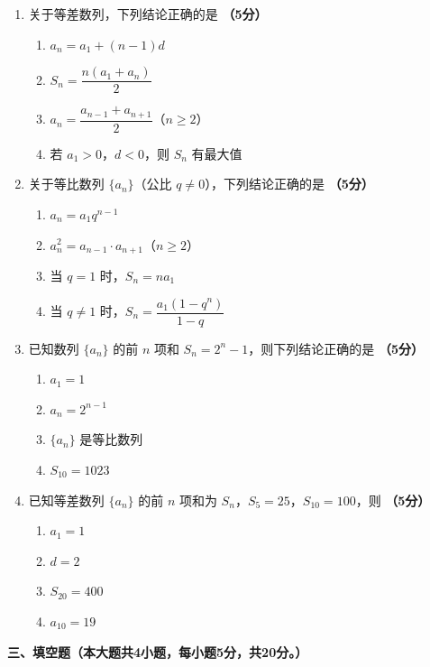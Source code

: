 \documentclass[12pt, a4paper]{ctexart}
\newcommand{\score}[1]{\hfill\textbf{（#1分）}}
\begin{document}
\begin{enumerate}[resume]
\item 关于等差数列，下列结论正确的是 \score{5}
\begin{enumerate}[label=\Alph*.]
\item $a_n=a_1+(n-1)d$
\item $S_n=\dfrac{n(a_1+a_n)}{2}$
\item $a_n=\dfrac{a_{n-1}+a_{n+1}}{2}$（$n\geq 2$）
\item 若 $a_1>0$，$d<0$，则 $S_n$ 有最大值
\end{enumerate}

\item 关于等比数列 $\{a_n\}$（公比 $q\neq 0$），下列结论正确的是 \score{5}
\begin{enumerate}[label=\Alph*.]
\item $a_n=a_1q^{n-1}$
\item $a_n^2=a_{n-1}\cdot a_{n+1}$（$n\geq 2$）
\item 当 $q=1$ 时，$S_n=na_1$
\item 当 $q\neq 1$ 时，$S_n=\dfrac{a_1(1-q^n)}{1-q}$
\end{enumerate}

\item 已知数列 $\{a_n\}$ 的前 $n$ 项和 $S_n=2^n-1$，则下列结论正确的是 \score{5}
\begin{enumerate}[label=\Alph*.]
\item $a_1=1$
\item $a_n=2^{n-1}$
\item $\{a_n\}$ 是等比数列
\item $S_{10}=1023$
\end{enumerate}

\item 已知等差数列 $\{a_n\}$ 的前 $n$ 项和为 $S_n$，$S_5=25$，$S_{10}=100$，则 \score{5}
\begin{enumerate}[label=\Alph*.]
\item $a_1=1$
\item $d=2$
\item $S_{20}=400$
\item $a_{10}=19$
\end{enumerate}
\end{enumerate}

\vspace{1em}

\noindent\textbf{三、填空题（本大题共4小题，每小题5分，共20分。）}

\vspace{0.5em}
\end{document}
